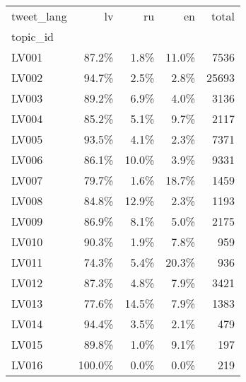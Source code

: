 \begin{tabular}{lrrrr}
\toprule
tweet\_lang &     lv &    ru &    en &  total \\
topic\_id &        &       &       &        \\
\midrule
LV001    &  87.2\% &  1.8\% & 11.0\% &   7536 \\
LV002    &  94.7\% &  2.5\% &  2.8\% &  25693 \\
LV003    &  89.2\% &  6.9\% &  4.0\% &   3136 \\
LV004    &  85.2\% &  5.1\% &  9.7\% &   2117 \\
LV005    &  93.5\% &  4.1\% &  2.3\% &   7371 \\
LV006    &  86.1\% & 10.0\% &  3.9\% &   9331 \\
LV007    &  79.7\% &  1.6\% & 18.7\% &   1459 \\
LV008    &  84.8\% & 12.9\% &  2.3\% &   1193 \\
LV009    &  86.9\% &  8.1\% &  5.0\% &   2175 \\
LV010    &  90.3\% &  1.9\% &  7.8\% &    959 \\
LV011    &  74.3\% &  5.4\% & 20.3\% &    936 \\
LV012    &  87.3\% &  4.8\% &  7.9\% &   3421 \\
LV013    &  77.6\% & 14.5\% &  7.9\% &   1383 \\
LV014    &  94.4\% &  3.5\% &  2.1\% &    479 \\
LV015    &  89.8\% &  1.0\% &  9.1\% &    197 \\
LV016    & 100.0\% &  0.0\% &  0.0\% &    219 \\
\bottomrule
\end{tabular}

